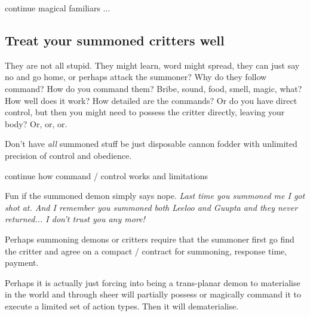 \todo continue magical familiars ...


\subsection*{Treat your summoned critters well}
They are not all stupid. They might learn, word might spread, they can just say no and go home, or perhaps attack the summoner? Why do they follow command? How do you command them? Bribe, sound, food, smell, magic, what? How well does it work? How detailed are the commands? Or do you have direct control, but then you might need to possess the critter directly, leaving your body? Or, or, or.

Don't have \emph{all} summoned stuff be just disposable cannon fodder with unlimited precision of control and obedience.

\todo continue how command / control works and limitations

Fun if the summoned demon simply says nope. \textit{Last time you summoned me I got shot at. And I remember you summoned both Leeloo and Guupta and they never returned... I don't trust you any more!}

Perhaps summoning demons or critters require that the summoner first go find the critter and agree on a compact / contract for summoning, response time, payment.

Perhaps it is actually just forcing into being a trans-planar demon to materialise in the world and through sheer will partially possess or magically command it to execute a limited set of action types. Then it will dematerialise.





